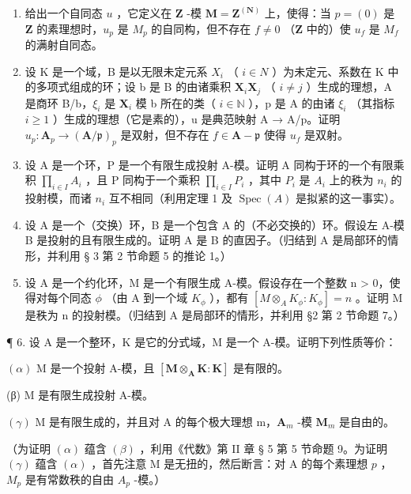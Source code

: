
\begin{enumerate}
\def\labelenumi{\arabic{enumi}.}
\item
  给出一个自同态 \(u\) ，它定义在 \(\mathbf{Z}\) -模 \(\mathbf{M} = \mathbf{Z}^{(\mathbf{N})}\) 上，使得：当 \(p = (0)\) 是 \(\mathbf{Z}\) 的素理想时，\(u_{p}\) 是 \(M_p\) 的自同构，但不存在 \(f \neq 0\) （\(\mathbf{Z}\) 中的）使 \(u_f\) 是 \(M_f\) 的满射自同态。
\item
  设 K 是一个域，B 是以无限未定元系 \(X_{i}\) （ \(i \in N\) ）为未定元、系数在 K 中的多项式组成的环；设 b 是 B 的由诸乘积 \(\mathbf{X}_i\mathbf{X}_j\) （ \(i \neq j\) ）生成的理想，A 是商环 B/b，\(\xi_i\) 是 \(\mathbf{X}_i\) 模 b 所在的类（ \(i \in \mathbb{N}\) ），p 是 A 的由诸 \(\xi_i\) （其指标 \(i \geqslant 1\) ）生成的理想（它是素的），u 是典范映射 A → A/p。证明 \(u_p: \mathbf{A}_p \to (\mathbf{A}/\mathfrak{p})_p\) 是双射，但不存在 \(f \in \mathbf{A} - \mathfrak{p}\) 使得 \(u_f\) 是双射。
\item
  设 A 是一个环，P 是一个有限生成投射 A-模。证明 A 同构于环的一个有限乘积 \(\prod_{i\in I}A_{i}\) ，且 P 同构于一个乘积 \(\prod_{i\in I}P_{i}\) ，其中 \(P_{i}\) 是 \(A_{i}\) 上的秩为 \(n_{i}\) 的投射模，而诸 \(n_{i}\) 互不相同（利用定理 1 及 \(\operatorname{Spec}(A)\) 是拟紧的这一事实）。
\item
  设 A 是一个（交换）环，B 是一个包含 A 的（不必交换的）环。假设左 A-模 B 是投射的且有限生成的。证明 A 是 B 的直因子。（归结到 A 是局部环的情形，并利用 § 3 第 2 节命题 5 的推论 1。）
\item
  设 A 是一个约化环，M 是一个有限生成 A-模。假设存在一个整数 n \textgreater{} 0，使得对每个同态 \(\phi\) （由 A 到一个域 \(K_{\phi}\) ），都有 \([M \otimes_{A} K_{\phi}: K_{\phi}] = n\) 。证明 M 是秩为 n 的投射模。（归结到 A 是局部环的情形，并利用 §2 第 2 节命题 7。）
\end{enumerate}

¶ 6. 设 A 是一个整环，K 是它的分式域，M 是一个 A-模。证明下列性质等价：

\((\alpha)\) M 是一个投射 A-模，且 \([\mathbf{M} \otimes_{\mathbf{A}} \mathbf{K} : \mathbf{K}]\) 是有限的。

(β) M 是有限生成投射 A-模。

\((\gamma)\) M 是有限生成的，并且对 A 的每个极大理想 m，\(\mathbf{A}_{m}\) -模 \(\mathbf{M}_{m}\) 是自由的。

（为证明 \((\alpha)\) 蕴含 \((\beta)\) ，利用《代数》第 II 章 § 5 第 5 节命题 9。为证明 \((\gamma)\) 蕴含 \((\alpha)\) ，首先注意 M 是无扭的，然后断言：对 A 的每个素理想 \(p\) ，\(M_{p}\) 是有常数秩的自由 \(A_{p}\) -模。）

